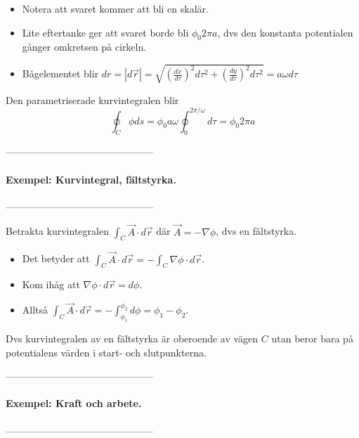 \documentclass[%
oneside,                 %
final,                   %
10pt]{article}
\begin{document}
\begin{itemize}
\item Notera att svaret kommer att bli en skalär.

\item Lite eftertanke ger att svaret borde bli $\phi_0 2 \pi a$, dvs den konstanta potentialen gånger omkretsen på cirkeln.

\item Bågelementet blir $dr = |d\vec{r}| = \sqrt{\left( \frac{dx}{d\tau} \right)^2 d\tau^2 + \left( \frac{dy}{d\tau} \right)^2 d\tau^2 } = a \omega d\tau$
\end{itemize}

\noindent
Den parametriserade kurvintegralen blir
\begin{equation}
\oint_C \phi ds = \phi_0 a \omega \oint_0^{2\pi/\omega}  d\tau = \phi_0 2 \pi a 
\end{equation}

---------------------------------------------

\paragraph{Exempel: Kurvintegral, fältstyrka.}
---------------------------------------------

Betrakta kurvintegralen $\int_C \vec{A} \cdot d\vec{r}$ där $\vec{A} = -\nabla \phi$, dvs en fältstyrka.
\begin{itemize}
\item Det betyder att $\int_C \vec{A} \cdot d\vec{r} = -\int_C \nabla{\phi} \cdot d\vec{r}$.

\item Kom ihåg att $\nabla\phi \cdot d\vec{r} = d\phi$.

\item Alltså $\int_C \vec{A} \cdot d\vec{r} = -\int_{\phi_1}^{\phi_2} d{\phi} = \phi_1 - \phi_2$.
\end{itemize}

\noindent
Dvs kurvintegralen av en fältstyrka är oberoende av vägen $C$ utan beror bara på potentialens värden i start- och slutpunkterna.

---------------------------------------------
\paragraph{Exempel: Kraft och arbete.}
---------------------------------------------
\end{document}
